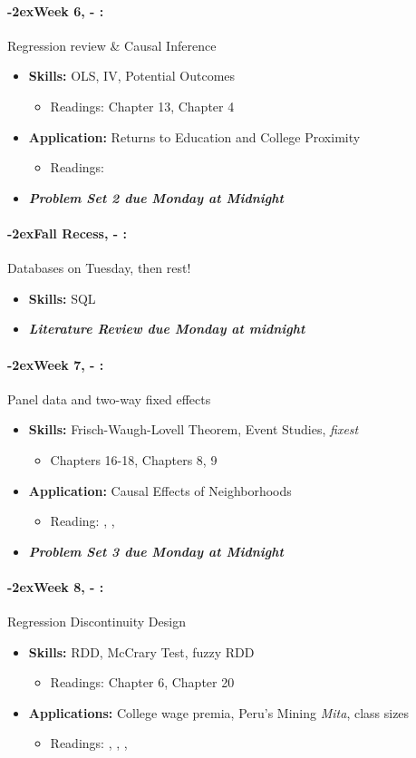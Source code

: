 \documentclass[11pt]{article}
\newcommand{\week}[1]{%
  \paragraph*{\kern-2ex\quad #1, \AdvanceDate[1]\syldate{\today} - \AdvanceDate[2]\syldate{\today}:}%
  \ifdim\wd1=\wd\MONDAY
    \AdvanceDate[7]
  \else
    \AdvanceDate[7]
  \fi%
}
\begin{document}
\week{Week 6} Regression review \& Causal Inference
\begin{itemize}
  \item \textbf{Skills:} OLS, IV, Potential Outcomes
  \begin{itemize}
    \item Readings: \cite{hungtintonklein2023effect} Chapter 13, \cite{cunningham2023mixtape} Chapter 4
  \end{itemize}
  \item \textbf{Application:} Returns to Education and College Proximity
  \begin{itemize}
    \item Readings: \textbf{\cite{card1993college}}
  \end{itemize}
  \item \textit{\textbf{Problem Set 2 due Monday at Midnight}}
\end{itemize}
\week{Fall Recess} Databases on Tuesday, then rest!
\begin{itemize}
  \item \textbf{Skills:} SQL
  \item \textit{\textbf{Literature Review due Monday at midnight}}
\end{itemize}
\week{Week 7} Panel data and two-way fixed effects
\begin{itemize}
  \item \textbf{Skills:} Frisch-Waugh-Lovell Theorem, Event Studies, \textit{fixest}
  \begin{itemize}
    \item \cite{hungtintonklein2023effect} Chapters 16-18, \cite{cunningham2023mixtape} Chapters 8, 9
  \end{itemize}
  \item \textbf{Application:} Causal Effects of Neighborhoods
  \begin{itemize}
    \item Reading: \textbf{\cite{chetty2018neighborhoods}}, \textbf{\cite{chetty2019moving}}, \textbf{\cite{chetty2016moving}}
  \end{itemize}
  \item \textit{\textbf{Problem Set 3 due Monday at Midnight}}
\end{itemize}
\week{Week 8} Regression Discontinuity Design
\begin{itemize}
  \item \textbf{Skills:} RDD, McCrary Test, fuzzy RDD
  \begin{itemize}
    \item Readings: \cite{cunningham2023mixtape} Chapter 6, \cite{hungtintonklein2023effect} Chapter 20
  \end{itemize}
  \item \textbf{Applications:} College wage premia, Peru's Mining \textit{Mita}, class sizes
  \begin{itemize}
    \item Readings: \textbf{\cite{dell2010mita}}, \textbf{\cite{zimmerman2014returns}}, \textbf{\cite{angrist1999maimonides}}, \cite{chetty2023diversifying}
  \end{itemize}
\end{itemize}
\end{document}
